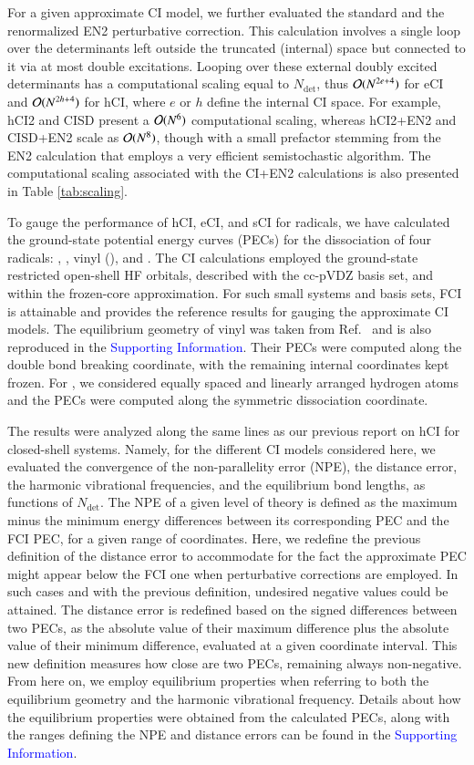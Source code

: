 \documentclass[aip,jcp,reprint,noshowkeys,superscriptaddress]{revtex4-1}
\newcommand{\SupInf}{\textcolor{blue}{Supporting Information}}
\newcommand{\Ndet}{N_\text{det}}
\begin{document}
For a given approximate CI model, we further evaluated the standard and the renormalized EN2 perturbative correction. \cite{Garniron_2019}
This calculation involves a single loop over the determinants left outside the truncated (internal) space but connected to it via at most double excitations.
Looping over these external doubly excited determinants has a computational scaling equal to $\Ndet$,
thus $\order*{N^{2e+4}}$ for eCI and $\order*{N^{2h+4}}$ for hCI, where $e$ or $h$ define the internal CI space.
For example, hCI2 and CISD present a $\order*{N^6}$ computational scaling, whereas hCI2+EN2 and CISD+EN2 scale as $\order*{N^8}$,
though with a small prefactor stemming from the EN2 calculation that employs a very efficient semistochastic algorithm. \cite{Garniron_2017}
The computational scaling associated with the CI+EN2 calculations is also presented in Table \ref{tab:scaling}.

To gauge the performance of hCI, eCI, and sCI for radicals, we have calculated the ground-state potential energy curves (PECs) for the dissociation of four radicals:
, , vinyl (), and .
The CI calculations employed the ground-state restricted open-shell HF orbitals, described with the cc-pVDZ basis set, and within the frozen-core approximation.
For such small systems and basis sets, FCI is attainable and provides the reference results for gauging the approximate CI models.
The equilibrium geometry of vinyl was taken from Ref.~ and is also reproduced in the {\SupInf}.
Their PECs were computed along the  double bond breaking coordinate, with the remaining internal coordinates kept frozen.
For , we considered equally spaced and linearly arranged hydrogen atoms and the PECs were computed along the symmetric dissociation coordinate.

The results were analyzed along the same lines as our previous report on hCI for closed-shell systems. \cite{Kossoski_2022}
Namely, for the different CI models considered here,
we evaluated the convergence of the non-parallelity error (NPE), the distance error, the harmonic vibrational frequencies, and the equilibrium bond lengths, as functions of $\Ndet$.
The NPE of a given level of theory is defined as the maximum minus the minimum energy differences between its corresponding PEC and the FCI PEC, for a given range of coordinates.
Here, we redefine the previous definition of the distance error \cite{Kossoski_2022} to accommodate for the fact the approximate PEC might appear below the FCI one when perturbative corrections are employed.
In such cases and with the previous definition, undesired negative values could be attained.
The distance error is redefined based on the signed differences between two PECs, as the absolute value of their maximum difference plus the absolute value of their minimum difference,
evaluated at a given coordinate interval.
This new definition measures how close are two PECs, remaining always non-negative.
From here on, we employ equilibrium properties when referring to both the equilibrium geometry and the harmonic vibrational frequency.
Details about how the equilibrium properties were obtained from the calculated PECs,
along with the ranges defining the NPE and distance errors can be found in the \SupInf.
\end{document}
